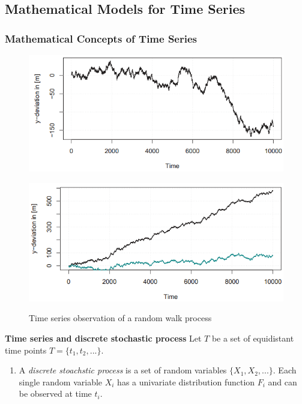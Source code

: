 \subsection{Mathematical Models for Time Series}
\subsubsection{Mathematical Concepts of Time Series}
{
\begin{figure}[H]\centering
	\begin{minipage}[c]{0.5\textwidth}
		\includegraphics[width=1\linewidth]{images/randomWalk.png}
		\label{Fig:raWa}
	\end{minipage}\hfill
	\begin{minipage}[c]{0.5\textwidth}
		\includegraphics[width=1\linewidth]{images/randomWalkDrift.png}
		\label{Fig:raWaDrift}
	\end{minipage}
\caption{Time series observation of a random walk process}
\end{figure}
\RTheory
{\textbf{Time series and discrete stochastic process}
Let $T$ be a set of equidistant time points $T=\{t_1,t_2,...\}$.
\begin{enumerate}
	\item A \textit{discrete stoachstic process} is a set of random variables $\{X_1, X_2, . . . \}$. Each single random variable $X_i$ has a univariate distribution function $F_i$ and can be observed at time $t_i$.

\end{enumerate}}}
